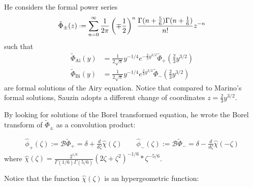 \documentclass{article}
\newcommand*{\defeq}{\mathrel{\vcenter{\baselineskip0.5ex \lineskiplimit0pt
                     \hbox{\scriptsize.}\hbox{\scriptsize.}}}%
                     =}
\begin{document}
He considers the formal power series  
\[\tilde{\Phi}_{\pm}(z)\defeq \sum_{n=0}^{\infty}\frac{1}{2\pi}\left(\mp\frac{1}{2}\right)^{n}\frac{\Gamma(n+\frac{5}{6})\Gamma(n+\frac{1}{6})}{n!}z^{-n}\]
such that
\begin{align*}
\tilde{\Phi}_{\mathrm{Ai}}(y)&=\frac{1}{2\sqrt{\pi}}y^{-1/4}e^{-\tfrac{2}{3}y^{3/2}}\tilde{\Phi}_{+}\left(\tfrac{2}{3}y^{3/2}\right)\\
\tilde{\Phi}_{\mathrm{Bi}}(y)&=\frac{1}{2\sqrt{\pi}}y^{-1/4}e^{\tfrac{2}{3}y^{3/2}}\tilde{\Phi}_{-}\left(\tfrac{2}{3}y^{3/2}\right)
\end{align*} 
are formal solutions of the Airy equation. Notice that compared to Marino's formal solutions, Sauzin adopts a different change of coordinates $z=\frac{2}{3}y^{3/2}$.  

By looking for solutions of the Borel transformed equation, he wrote the Borel transform of $\tilde{\Phi}_{\pm}$ as a convolution product: 

\begin{align*}
\hat{\phi}_+(\zeta):=\mathcal{B}\tilde{\Phi}_+=\delta+\frac{d}{d\zeta}\hat{\chi}(\zeta)  \qquad \hat{\phi}_-(\zeta):=\mathcal{B}\tilde{\Phi}_-=\delta-\frac{d}{d\zeta}\hat{\chi}(-\zeta)
\end{align*}
 where $\hat{\chi}(\zeta)=\frac{2^{1/6}}{\Gamma(1/6)\Gamma(5/6)}(2\zeta+\zeta^2)^{-1/6}\ast \zeta^{-5/6}$.

%

Notice that the function $\hat{\chi}(\zeta)$ is an hypergeometric function:
\end{document}
